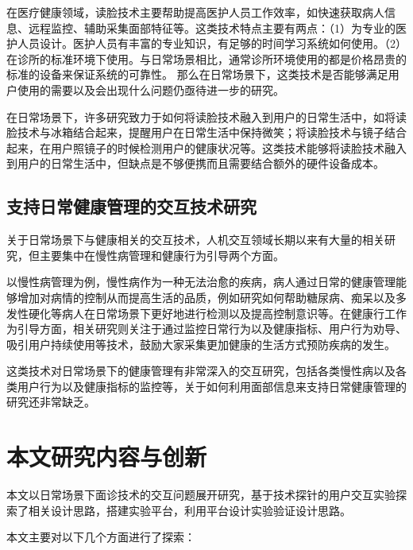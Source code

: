 在医疗健康领域，读脸技术主要帮助提高医护人员工作效率，如快速获取病人信息\cite{nwosu2016mobile}、远程监控\cite{Hossain2015Cloud}、辅助采集面部特征\cite{张红凯2015中医面诊信息采集与识别方法研究进展}等。这类技术特点主要有两点：（1）为专业的医护人员设计。医护人员有丰富的专业知识，有足够的时间学习系统如何使用。（2）在诊所的标准环境下使用。与日常场景相比，通常诊所环境使用的都是价格昂贵的标准的设备来保证系统的可靠性。
那么在日常场景下，这类技术是否能够满足用户使用的需要以及会出现什么问题仍亟待进一步的研究。

在日常场景下，许多研究致力于如何将读脸技术融入到用户的日常生活中，如将读脸技术与冰箱结合起来，提醒用户在日常生活中保持微笑\cite{Tsujita2011Smiling}；将读脸技术与镜子结合起来，在用户照镜子的时候检测用户的健康状况\cite{andreu2015mirror}等。这类技术能够将读脸技术融入到用户的日常生活中，但缺点是不够便携而且需要结合额外的硬件设备成本。

\subsection{支持日常健康管理的交互技术研究}
关于日常场景下与健康相关的交互技术，人机交互领域长期以来有大量的相关研究，但主要集中在慢性病管理和健康行为引导两个方面。

以慢性病管理为例，慢性病作为一种无法治愈的疾病，病人通过日常的健康管理能够增加对病情的控制从而提高生活的品质，例如研究如何帮助糖尿病\cite{mamykina2008mahi}、痴呆\cite{yasuda2009remote}以及多发性硬化\cite{ayobi2017quantifying}等病人在日常场景下更好地进行检测以及提高控制意识等。在健康行工作为引导方面，相关研究则关注于通过监控日常行为\cite{purpura2011fit4life,Inagawa2013A,bravata2007using,cordeiro2015barriers,lin2006fish, miller2014stepstream}以及健康指标\cite{kay2012lullaby,gronvall2013beyond,logan2007mobile,walters2010a}、用户行为劝导、吸引用户持续使用等技术，鼓励大家采集更加健康的生活方式预防疾病的发生。

这类技术对日常场景下的健康管理有非常深入的交互研究，包括各类慢性病以及各类用户行为以及健康指标的监控等，关于如何利用面部信息来支持日常健康管理的研究还非常缺乏。

\section{本文研究内容与创新}

本文以日常场景下面诊技术的交互问题展开研究，基于技术探针的用户交互实验探索了相关设计思路，搭建实验平台，利用平台设计实验验证设计思路。

本文主要对以下几个方面进行了探索：

